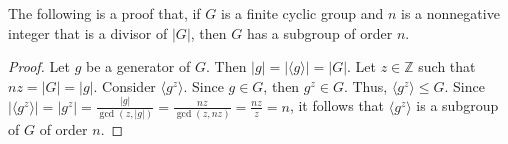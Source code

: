 \documentclass[12pt]{article}
\begin{document}
The following is a proof that, if $G$ is a finite cyclic group and $n$ is a nonnegative integer that is a divisor of $|G|$, then $G$ has a subgroup of order $n$.

\begin{proof}
Let $g$ be a generator of $G$.  Then $|g|=|\langle g \rangle |=|G|$.  Let $z \in {\mathbb Z}$ such that $nz=|G|=|g|$.  Consider $\langle g^z \rangle$.  Since $g \in G$, then $g^z \in G$.  Thus, $\langle g^z \rangle \le G$.  Since $\displaystyle |\langle g^z \rangle |=|g^z|=\frac {|g|}{\gcd(z,|g|)}=\frac {nz}{\gcd(z,nz)}=\frac {nz}{z}=n$, it follows that $\langle g^z \rangle$ is a subgroup of $G$ of order $n$.
\end{proof}
\end{document}
